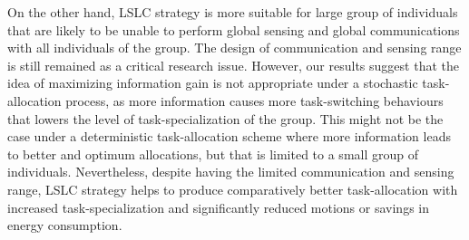 \documentclass[final,5p,times,twocolumn]{elsarticle}
\begin{document}
On the other hand, LSLC strategy is more suitable for large group of individuals that are likely to be unable to perform global sensing and global communications with all individuals of the group. The design of communication and sensing range is still remained as a critical research issue. However, our results suggest that the idea of maximizing information gain is not appropriate under a stochastic task-allocation process, as more information causes more task-switching behaviours that lowers the level of task-specialization of the group. This might not be the case under a deterministic task-allocation scheme where more information leads to better and optimum allocations, but that is limited to a small group of individuals. Nevertheless, despite having the limited communication and sensing range, LSLC strategy helps to produce comparatively better task-allocation with increased task-specialization and significantly reduced motions or savings in energy consumption.



\end{document}
